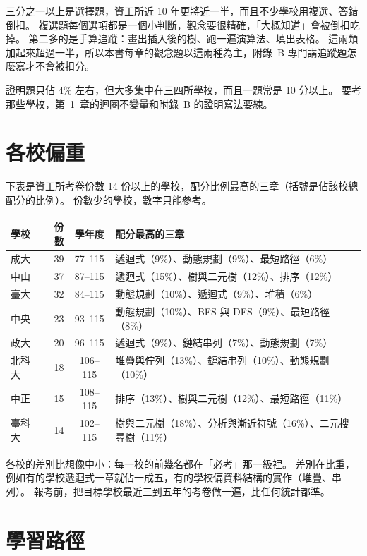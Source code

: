 三分之一以上是選擇題，資工所近 10 年更將近一半，而且不少學校用複選、答錯倒扣。 複選題每個選項都是一個小判斷，觀念要很精確，「大概知道」會被倒扣吃掉。 第二多的是手算追蹤：畫出插入後的樹、跑一遍演算法、填出表格。 這兩類加起來超過一半，所以本書每章的觀念題以這兩種為主，附錄~B 專門講追蹤題怎麼寫才不會被扣分。

證明題只佔 $4\%$ 左右，但大多集中在三四所學校，而且一題常是 10 分以上。 要考那些學校，第~1~章的迴圈不變量和附錄~B 的證明寫法要練。

\section*{各校偏重}

下表是資工所考卷份數 14 份以上的學校，配分比例最高的三章（括號是佔該校總配分的比例）。 份數少的學校，數字只能參考。

{\small
\begin{center}
\begin{tabular}{lrcl}
\toprule
學校 & 份數 & 學年度 & 配分最高的三章 \\
\midrule
成大 & 39 & 77--115 & 遞迴式（9\%）、動態規劃（9\%）、最短路徑（6\%） \\
中山 & 37 & 87--115 & 遞迴式（15\%）、樹與二元樹（12\%）、排序（12\%） \\
臺大 & 32 & 84--115 & 動態規劃（10\%）、遞迴式（9\%）、堆積（6\%） \\
中央 & 23 & 93--115 & 動態規劃（10\%）、BFS 與 DFS（9\%）、最短路徑（8\%） \\
政大 & 20 & 96--115 & 遞迴式（9\%）、鏈結串列（7\%）、動態規劃（7\%） \\
北科大 & 18 & 106--115 & 堆疊與佇列（13\%）、鏈結串列（10\%）、動態規劃（10\%） \\
中正 & 15 & 108--115 & 排序（13\%）、樹與二元樹（12\%）、最短路徑（11\%） \\
臺科大 & 14 & 102--115 & 樹與二元樹（18\%）、分析與漸近符號（16\%）、二元搜尋樹（11\%） \\
\bottomrule
\end{tabular}
\end{center}}

各校的差別比想像中小：每一校的前幾名都在「必考」那一級裡。 差別在比重，例如有的學校遞迴式一章就佔一成五，有的學校偏資料結構的實作（堆疊、串列）。 報考前，把目標學校最近三到五年的考卷做一遍，比任何統計都準。

\section*{學習路徑}

